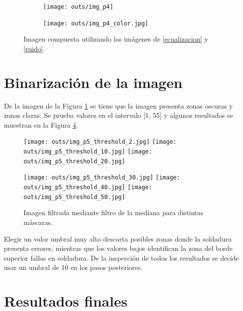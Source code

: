 \documentclass[
  letterpaper,
  twocolumn,
  9pt,
  journal,
  final]{IEEEtran}
\begin{document}
\begin{figure}[!tbh]
\centering
\begin{subfigure}[b]{\columnwidth}
 	\texttt{[image: outs/img\_p4]}
  	\label{fig:pregunta4}
\end{subfigure}
\begin{subfigure}[b]{\columnwidth}
 	\texttt{[image: outs/img\_p4\_color.jpg]}
  	\label{fig:pregunta4color}
\end{subfigure}
\caption{Imagen compuesta utilizando las imágenes de \ref{ecualizacion} y \ref{ruido}.}
\label{fig:p4_both}
\end{figure}


\section{Binarización de la imagen}\label{bin}


De la imagen de la Figura \ref{fig:pregunta4} se tiene que la imagen presenta zonas oscuras y zonas claras. Se prueba valores en el intervalo [1, 55] y algunos resultados se muestran en la Figura \ref{fig:threshold_grid}.


\begin{figure}[!tbh]
\centering
\texttt{[image: outs/img\_p5\_threshold\_2.jpg]}\quad
\texttt{[image: outs/img\_p5\_threshold\_10.jpg]}\quad
\texttt{[image: outs/img\_p5\_threshold\_20.jpg]}

\medskip

\texttt{[image: outs/img\_p5\_threshold\_30.jpg]}\quad
\texttt{[image: outs/img\_p5\_threshold\_40.jpg]}\quad
\texttt{[image: outs/img\_p5\_threshold\_50.jpg]}

 \caption{Imagen filtrada mediante filtro de la mediana para distintas máscaras.}
 \label{fig:threshold_grid}
\end{figure}

Elegir un valor umbral muy alto descarta posibles zonas donde la soldadura presenta errores, mientras que los valores bajos identifican la zona del borde superior fallas en soldadura. De la inspección de todos los resultados se decide usar un umbral de 10 en los pasos posteriores.


\section{Resultados finales}
\end{document}
